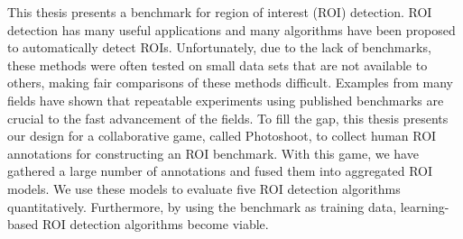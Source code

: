 \begin{abstractEN}

This thesis presents a benchmark for region of interest (ROI)
detection. ROI detection has many useful applications and many
algorithms have been proposed to automatically detect ROIs.
Unfortunately, due to the lack of benchmarks, these methods were
often tested on small data sets that are not available to others,
making fair comparisons of these methods difficult. Examples from
many fields have shown that repeatable experiments using published
benchmarks are crucial to the fast advancement of the fields. To
fill the gap, this thesis presents our design for a collaborative
game, called Photoshoot, to collect human ROI annotations for
constructing an ROI benchmark. With this game, we have gathered a
large number of annotations and fused them into aggregated ROI
models. We use these models to evaluate five ROI detection
algorithms quantitatively. Furthermore, by using the benchmark as
training data, learning-based ROI detection algorithms become
viable.

\end{abstractEN}

\begin{comment}

\category{I2.10}{Computing Methodologies}{Artificial Intelligence --
Vision and Scene Understanding} \category{H5.3}{Information
Systems}{Information Interfaces and Presentation (HCI) -- Web-based
Interaction.}

\terms{Design, Human factors, Performance.}

\keywords{Region of interest, Visual attention model, Web-based
games, Benchmarks.}

\end{comment}
